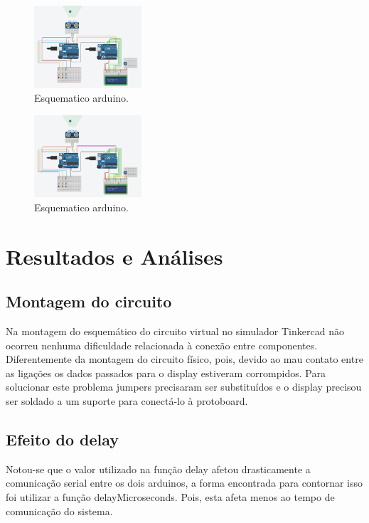 \documentclass[conference]{IEEEtran}
\begin{document}
\begin{figure}[htbp]
    \centerline{
        \includegraphics[width=4cm]{images/esquema-arduino.png}
    }
    \caption{Esquematico arduino.}
    \label{fig}
\end{figure}

\begin{figure}[htbp]
    \centerline{
        \includegraphics[width=4cm]{images/esquema-arduino.png}
    }
    \caption{Esquematico arduino.}
    \label{fig}
\end{figure}

\section{Resultados e Análises}

\subsection{Montagem do circuito}

Na montagem do esquemático do circuito virtual no simulador Tinkercad não ocorreu nenhuma dificuldade relacionada à conexão entre componentes.
Diferentemente da montagem do circuito físico, pois, devido ao mau contato entre as ligações os dados passados para o display estiveram corrompidos. Para solucionar este problema jumpers precisaram ser substituídos
e o display precisou ser soldado a um suporte para conectá-lo à protoboard.

\subsection{Efeito do delay}
Notou-se que o valor utilizado na função delay afetou drasticamente a comunicação serial entre os dois arduinos, a forma encontrada para contornar isso foi utilizar a função delayMicroseconds. Pois, esta afeta menos ao tempo de comunicação do sistema.
\end{document}
